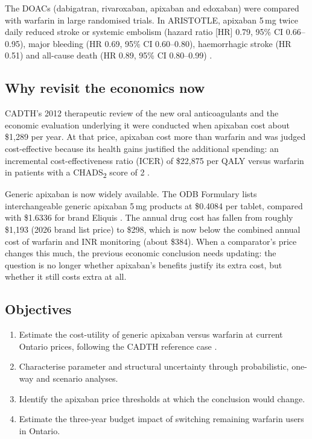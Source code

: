 \documentclass[11pt,letterpaper]{article}
\begin{document}
The DOACs (dabigatran, rivaroxaban, apixaban and edoxaban) were compared with warfarin in large
randomised trials. In ARISTOTLE, apixaban 5\,mg twice daily reduced stroke or systemic embolism
(hazard ratio [HR] 0.79, 95\% CI 0.66--0.95), major bleeding (HR 0.69, 95\% CI 0.60--0.80),
haemorrhagic stroke (HR 0.51) and all-cause death (HR 0.89, 95\% CI 0.80--0.99)
\cite{aristotle}.

\subsection{Why revisit the economics now}

CADTH's 2012 therapeutic review of the new oral anticoagulants \cite{wells2012} and the
economic evaluation underlying it \cite{coyle2013} were conducted when apixaban cost about
\$1,289 per year. At that price, apixaban cost more than warfarin and was judged cost-effective
because its health gains justified the additional spending: an incremental cost-effectiveness
ratio (ICER) of \$22,875 per QALY versus warfarin in patients with a CHADS\textsubscript{2} score
of 2 \cite{cadthwe}.

Generic apixaban is now widely available. The ODB Formulary lists interchangeable generic
apixaban 5\,mg products at \$0.4084 per tablet, compared with \$1.6336 for brand Eliquis
\cite{odb}. The annual drug cost has fallen from roughly \$1,193 (2026 brand
list price) to \$298, which is now below the combined annual cost of warfarin and INR monitoring
(about \$384). When a comparator's price changes this much, the previous economic conclusion
needs updating: the question is no longer whether apixaban's benefits justify its extra cost,
but whether it still costs extra at all.

\subsection{Objectives}

\begin{enumerate}
  \item Estimate the cost-utility of generic apixaban versus warfarin at current Ontario prices,
        following the CADTH reference case \cite{cadthguide}.
  \item Characterise parameter and structural uncertainty through probabilistic, one-way and
        scenario analyses.
  \item Identify the apixaban price thresholds at which the conclusion would change.
  \item Estimate the three-year budget impact of switching remaining warfarin users in Ontario.
\end{enumerate}
\end{document}
